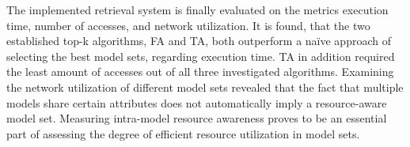  The implemented retrieval system is finally evaluated on the metrics execution time, number of accesses, and network utilization. It is found, that the two established top-k algorithms, FA and TA, both outperform a naïve approach of selecting the best model sets, regarding execution time. TA in addition required the least amount of accesses out of all three investigated algorithms. Examining the network utilization of different model sets revealed that the fact that multiple models share certain attributes does not automatically imply a resource-aware model set. Measuring intra-model resource awareness proves to be an essential part of assessing the degree of efficient resource utilization in model sets.